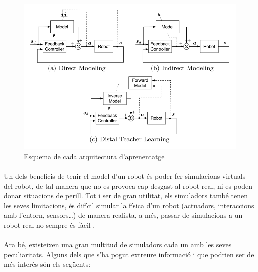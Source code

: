 \documentclass[12pt,a4paper,final,twoside]{article}
\begin{document}
\begin{figure}[h]
\begin{center}
\includegraphics[scale=0.4]{Imatges/arquitectures-d'aprenentatge.png}
\caption{Esquema de cada arquitectura d'aprenentatge \cite{Nguyen-Tuong2011}\label{fig:esquema-arquitectures-models}}
\end{center}
\end{figure}


\paragraph{}Un dels beneficis de tenir el model d'un robot és poder fer simulacions virtuals del robot, de tal manera que no es provoca cap desgast al robot real, ni es poden donar situacions de perill. Tot i ser de gran utilitat, els simuladors també tenen les seves limitacions, és difícil simular la física d'un robot (actuadors, interaccions amb l'entorn, sensors\dots) de manera realista, a més, passar de simulacions a un robot real no sempre és fàcil \cite{Hohl2006}.

\paragraph{}Ara bé, existeixen una gran multitud de simuladors cada un amb les seves peculiaritats. Alguns dels que s'ha pogut extreure informació i que podrien ser de més interès són els següents:
\end{document}
